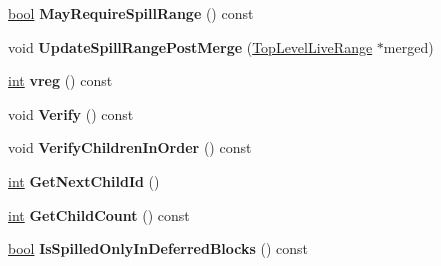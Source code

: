 \begin{DoxyCompactItemize}
\mbox{\hyperlink{classbool}{bool}} {\bfseries May\+Require\+Spill\+Range} () const
\item 
\mbox{\label{classv8_1_1internal_1_1compiler_1_1TopLevelLiveRange_a374133d33ed5a335bcfc2d7b5f863cf1}} 
void {\bfseries Update\+Spill\+Range\+Post\+Merge} (\mbox{\hyperlink{classv8_1_1internal_1_1compiler_1_1TopLevelLiveRange}{Top\+Level\+Live\+Range}} $\ast$merged)
\item 
\mbox{\label{classv8_1_1internal_1_1compiler_1_1TopLevelLiveRange_aef02715ee75ec8f8b06bdef421b6aca4}} 
\mbox{\hyperlink{classint}{int}} {\bfseries vreg} () const
\item 
\mbox{\label{classv8_1_1internal_1_1compiler_1_1TopLevelLiveRange_ad6e1293b23b9b1a474dd5ac5ee4eb02a}} 
void {\bfseries Verify} () const
\item 
\mbox{\label{classv8_1_1internal_1_1compiler_1_1TopLevelLiveRange_a1d196cc180cf9cf67a984d3f61f7fae0}} 
void {\bfseries Verify\+Children\+In\+Order} () const
\item 
\mbox{\label{classv8_1_1internal_1_1compiler_1_1TopLevelLiveRange_a5bc9f21f14158644c72a6f32ac2966f9}} 
\mbox{\hyperlink{classint}{int}} {\bfseries Get\+Next\+Child\+Id} ()
\item 
\mbox{\label{classv8_1_1internal_1_1compiler_1_1TopLevelLiveRange_a1429b093a5ad9f4e76db9d8245c8e67d}} 
\mbox{\hyperlink{classint}{int}} {\bfseries Get\+Child\+Count} () const
\item 
\mbox{\label{classv8_1_1internal_1_1compiler_1_1TopLevelLiveRange_a517946e4dfd64d7365cb85619daeb8c8}} 
\mbox{\hyperlink{classbool}{bool}} {\bfseries Is\+Spilled\+Only\+In\+Deferred\+Blocks} () const
\item 
\mbox{\label{classv8_1_1internal_1_1compiler_1_1TopLevelLiveRange_a3189db4b4884f79671ad9f897a174fe4}} 

\end{DoxyCompactItemize}

